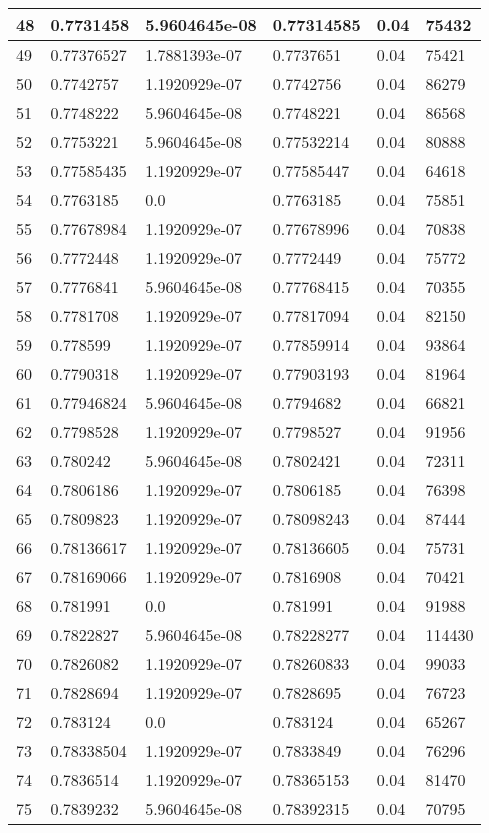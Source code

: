 \begin{longtable}{|l|l|l|l|l|l|}
48 & 0.7731458 & 5.9604645e-08 & 0.77314585 & 0.04 & 75432 \\ \hline 
49 & 0.77376527 & 1.7881393e-07 & 0.7737651 & 0.04 & 75421 \\ \hline 
50 & 0.7742757 & 1.1920929e-07 & 0.7742756 & 0.04 & 86279 \\ \hline 
51 & 0.7748222 & 5.9604645e-08 & 0.7748221 & 0.04 & 86568 \\ \hline 
52 & 0.7753221 & 5.9604645e-08 & 0.77532214 & 0.04 & 80888 \\ \hline 
53 & 0.77585435 & 1.1920929e-07 & 0.77585447 & 0.04 & 64618 \\ \hline 
54 & 0.7763185 & 0.0 & 0.7763185 & 0.04 & 75851 \\ \hline 
55 & 0.77678984 & 1.1920929e-07 & 0.77678996 & 0.04 & 70838 \\ \hline 
56 & 0.7772448 & 1.1920929e-07 & 0.7772449 & 0.04 & 75772 \\ \hline 
57 & 0.7776841 & 5.9604645e-08 & 0.77768415 & 0.04 & 70355 \\ \hline 
58 & 0.7781708 & 1.1920929e-07 & 0.77817094 & 0.04 & 82150 \\ \hline 
59 & 0.778599 & 1.1920929e-07 & 0.77859914 & 0.04 & 93864 \\ \hline 
60 & 0.7790318 & 1.1920929e-07 & 0.77903193 & 0.04 & 81964 \\ \hline 
61 & 0.77946824 & 5.9604645e-08 & 0.7794682 & 0.04 & 66821 \\ \hline 
62 & 0.7798528 & 1.1920929e-07 & 0.7798527 & 0.04 & 91956 \\ \hline 
63 & 0.780242 & 5.9604645e-08 & 0.7802421 & 0.04 & 72311 \\ \hline 
64 & 0.7806186 & 1.1920929e-07 & 0.7806185 & 0.04 & 76398 \\ \hline 
65 & 0.7809823 & 1.1920929e-07 & 0.78098243 & 0.04 & 87444 \\ \hline 
66 & 0.78136617 & 1.1920929e-07 & 0.78136605 & 0.04 & 75731 \\ \hline 
67 & 0.78169066 & 1.1920929e-07 & 0.7816908 & 0.04 & 70421 \\ \hline 
68 & 0.781991 & 0.0 & 0.781991 & 0.04 & 91988 \\ \hline 
69 & 0.7822827 & 5.9604645e-08 & 0.78228277 & 0.04 & 114430 \\ \hline 
70 & 0.7826082 & 1.1920929e-07 & 0.78260833 & 0.04 & 99033 \\ \hline 
71 & 0.7828694 & 1.1920929e-07 & 0.7828695 & 0.04 & 76723 \\ \hline 
72 & 0.783124 & 0.0 & 0.783124 & 0.04 & 65267 \\ \hline 
73 & 0.78338504 & 1.1920929e-07 & 0.7833849 & 0.04 & 76296 \\ \hline 
74 & 0.7836514 & 1.1920929e-07 & 0.78365153 & 0.04 & 81470 \\ \hline 
75 & 0.7839232 & 5.9604645e-08 & 0.78392315 & 0.04 & 70795 \\ \hline 
\end{longtable}